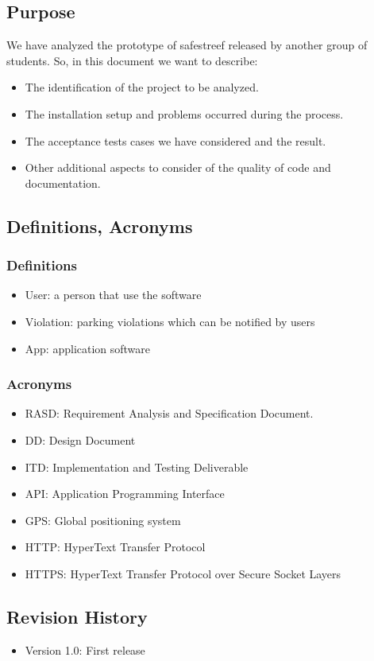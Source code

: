 
\subsection{Purpose}
We have analyzed the prototype of safestreef released by another group of students. So, in this document we want to describe:
\begin{itemize}
\item	The identification of the project to be analyzed.
\item	The installation setup and problems occurred during the process.
\item	The acceptance tests cases we have considered and the result. 
\item	Other additional aspects to consider of the quality of code and documentation.
\end{itemize}

\subsection{Definitions, Acronyms}
\subsubsection {Definitions}
\begin{itemize}
\item     User: a person that use the software
\item	Violation: parking violations which can be notified by users
\item	App: application software 
\end{itemize}
	\subsubsection {Acronyms}
\begin{itemize}
\item	RASD: Requirement Analysis and Specification Document.
\item      DD: Design Document
\item      ITD: Implementation and Testing Deliverable
\item	API: Application Programming Interface
\item	GPS: Global positioning system
\item	HTTP: HyperText Transfer Protocol
\item	HTTPS: HyperText Transfer Protocol over Secure Socket Layers

\end{itemize}
\subsection {Revision History}
\begin{itemize}
\item	Version 1.0: First release
\end{itemize}
